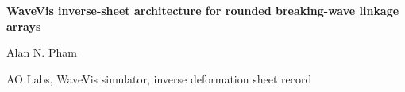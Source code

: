\documentclass[12pt,letterpaper]{article}
\begin{document}
\linenumbers
\thispagestyle{empty}

\begin{center}
    \vspace*{-0.6em}

    {\fontsize{20}{22}\selectfont\bfseries\color{SumiInk}
    WaveVis inverse-sheet architecture for rounded breaking-wave linkage arrays\par}

    \vspace{0.95em}

    {\normalsize\color{SumiInk}
    Alan N. Pham\par}

    \vspace{0.38em}

    {\small\color{DustyTaupe}
    AO Labs, WaveVis simulator, inverse deformation sheet record\par}
\end{center}
\end{document}
